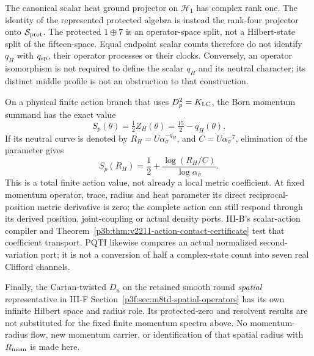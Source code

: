 \documentclass[12pt,a4paper]{article}
\begin{document}
\begin{remark}
\label{p3c:rem:v2218-fixed-seed-role-status}
The canonical scalar heat ground projector on \(\mathcal H_1\) has
complex rank one. The identity of the represented protected algebra is
instead the rank-four projector onto \(\mathcal S_{\rm prot}\).
The protected \(1\oplus7\) is an operator-space split, not a
Hilbert-state split of the fifteen-space. Equal endpoint scalar counts
therefore do not identify \(q_H\) with \(q_{\rm sp}\), their
operator processes or their clocks. Conversely, an operator isomorphism
is not required to define the scalar \(q_H\) and its neutral
character; its distinct middle profile is not an obstruction to that
construction.

On a physical finite action branch that uses \(D_p^2=K_{\rm LC}\),
the Born momentum summand has the exact value
\[
 S_p(\theta)=\tfrac12Z_H(\theta)=\tfrac{15}{2}-q_H(\theta).
\]
If its neutral curve is denoted by
\(R_H=U\alpha_\sigma^{-q_H}\), and
\(C=U\alpha_\sigma^{-7}\), elimination of the parameter gives
\begin{equation}
 \boxed{S_p(R_H)=\frac12+
                  \frac{\log(R_H/C)}{\log\alpha_\sigma}.}
 \label{p3c:eq:v2218-fixed-heat-log-value}
\end{equation}
This is a total finite action value, not already a local metric
coefficient. At fixed momentum operator, trace, radius and heat
parameter its direct reciprocal-position metric derivative is zero;
the complete action can still respond through its derived position,
joint-coupling or actual density ports. III-B's scalar-action compiler
and Theorem~\ref{p3b:thm:v2211-action-contact-certificate} test that
coefficient transport. PQTI likewise compares an actual normalized
second-variation port; it is not a conversion of half a complex-state
count into seven real Clifford channels.

Finally, the Cartan-twisted \(D_u\) on the retained smooth round
\emph{spatial} representative in III-F
Section~\ref{p3f:sec:m8td-spatial-operators} has its own infinite
Hilbert space and radius role. Its protected-zero and resolvent results
are not substituted for the fixed finite momentum spectra above.
No momentum-radius flow, new momentum carrier, or identification of
that spatial radius with \(R_{\mathrm{mom}}\) is made here.
\end{remark}
\end{document}
